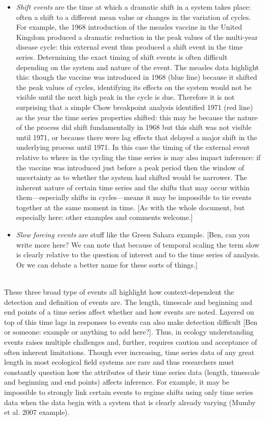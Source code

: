 \documentclass[11pt,a4paper,oneside]{article}
\begin{document}
\begin{itemize}
\item \emph{Shift events} are the time at which a dramatic shift in a system takes place: often a shift to a different mean value or changes in the variation of cycles. For example, the 1968 introduction of the measles vaccine in the United Kingdom produced a dramatic reduction in the peak values of the multi-year disease cycle: this external event thus produced a shift event in the time series. Determining the exact timing of shift events is often difficult depending on the system and nature of the event. The measles data highlight this: though the vaccine was introduced in 1968 (blue line) because it shifted the peak values of cycles, identifying its effects on the system would not be visible until the next high peak in the cycle is due. Therefore it is not surprising that a simple Chow breakpoint analysis identified 1971 (red line) as the year the time series properties shifted: this may be because the nature of the process did shift fundamentally in 1968 but this shift was not visible until 1971, or because there were lag effects that delayed a major shift in the underlying process until 1971. In this case the timing of the external event relative to where in the cycling the time series is may also impact inference: if the vaccine was introduced just before a peak period then the window of uncertainty as to whether the system had shifted would be narrower. The inherent nature of certain time series and the shifts that may occur within them---especially shifts in cycles---means it may be impossible to tie events together at the same moment in time. [As with the whole document, but especially here: other examples and comments welcome.]
\item \emph{Slow forcing events} are stuff like the Green Sahara example. [Ben, can you write more here? We can note that because of temporal scaling the term slow is clearly relative to the question of interest and to the time series of analysis. Or we can debate a better name for these sorts of things.]
\end{itemize}
\\
These three broad type of events all highlight how context-dependent the detection and definition of events are. The length, timescale and beginning and end points of a time series affect whether and how events are noted. Layered on top of this time lags in responses to events can also make detection difficult [Ben or someone: example or anything to add here?]. Thus, in ecology understanding events raises multiple challenges and, further, requires caution and acceptance of often inherent limitations. Though ever increasing, time series data of any great length in most ecological field systems are rare and thus researchers must constantly question how the attributes of their time series data (length, timescale and beginning and end points) affects inference. For example, it may be impossible to strongly link certain events to regime shifts using only time series data when the data begin with a system that is clearly already varying (Mumby et al. 2007 example). \\
 
\end{document}
